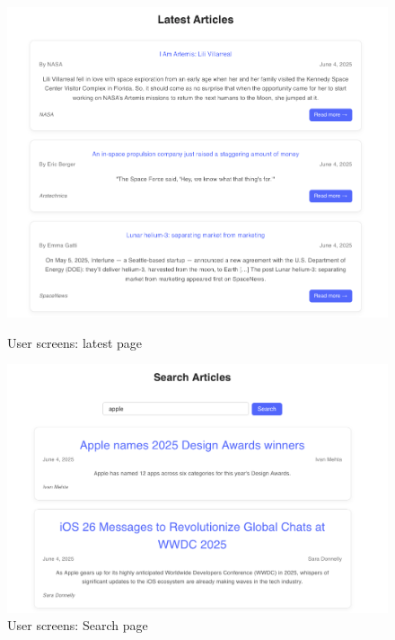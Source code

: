 \begin{figure}[!h]
    \centering
    \begin{minipage}{0.48\linewidth}
        \centering
        \includegraphics[width=1\textwidth]{chapters/chapter_03/page/user/latest-page}
        \caption{User screens: latest page}
        \label{fig:latest-wireframes}
    \end{minipage}
    \hfil
    \begin{minipage}{0.48\linewidth}
        \centering
        \includegraphics[width=1\textwidth]{chapters/chapter_03/page/user/search-page}
        \caption{User screens: Search page}
        \label{fig:search-wireframes}
    \end{minipage}
\end{figure}


